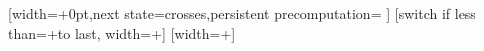 
{
  [width=+0pt,next state=crosses,persistent precomputation={
    \edef\pgf@lib@dec@ssw{\pgfmathresult pt}
    \edef\pgf@lib@dec@ssh{\pgfmathresult pt}
  }]{}  
  [switch if less than=+\pgfdecorationsegmentlength to last,
                  width=+\pgfdecorationsegmentlength]
  {
    \pgfpathmoveto{\pgfqpoint{-\pgf@lib@dec@ssw}{\pgf@lib@dec@ssh}}
    \pgfpathlineto{\pgfqpoint{\pgf@lib@dec@ssw}{-\pgf@lib@dec@ssh}}
    \pgfpathmoveto{\pgfqpoint{-\pgf@lib@dec@ssw}{-\pgf@lib@dec@ssh}}
    \pgfpathlineto{\pgfqpoint{\pgf@lib@dec@ssw}{\pgf@lib@dec@ssh}}
  }
  [width=+\pgfdecoratedremainingdistance]
  {
    \pgfpathmoveto{\pgfqpoint{-\pgf@lib@dec@ssw}{\pgf@lib@dec@ssh}}
    \pgfpathlineto{\pgfqpoint{\pgf@lib@dec@ssw}{-\pgf@lib@dec@ssh}}
    \pgfpathmoveto{\pgfqpoint{-\pgf@lib@dec@ssw}{-\pgf@lib@dec@ssh}}
    \pgfpathlineto{\pgfqpoint{\pgf@lib@dec@ssw}{\pgf@lib@dec@ssh}}
  }
}






%	
%	
%	

\newif\ifpgf@lib@shapedecoration@betweenborders

\edef\pgf@lib@shapedecoration@initialise{0pt}%

